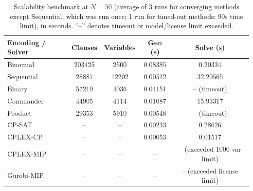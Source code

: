 \documentclass[a4paper,fleqn]{cas-sc}
\begin{document}
\begin{table}[htbp]
    \centering
    \renewcommand{\arraystretch}{1.10}
    \caption{Scalability benchmark at $N=50$ (average of 3 runs for converging methods except Sequential, which was run once; 1 run for timed-out methods; 90s time limit), in seconds. ``--'' denotes timeout or model/license limit exceeded.}
    \label{tab:scalability50}
    \begin{tabular}{l S[table-format=6.0] S[table-format=5.0] S[table-format=1.5] S[table-format=2.5]}
        \toprule
        \textbf{Encoding / Solver} & \textbf{Clauses} & \textbf{Variables} & \textbf{Gen (s)} & \textbf{Solve (s)} \\
        \midrule
        Binomial  & 203425 & 2500 & 0.08385 & 0.20334 \\
        Sequential & 28887 & 12202 & 0.00512 & 32.20565 \\
        Binary    & 57219 & 4036 & 0.04151 & {-- (timeout)} \\
        Commander & 44905 & 4114 & 0.01087 & 15.93317 \\
        Product   & 29353 & 5910 & 0.00548 & {-- (timeout)} \\
        \midrule
        CP-SAT    & {--}     &   {--}  & 0.00233 & 0.28626 \\
        CPLEX-CP  & {--}     &   {--}  & 0.00053 & 0.01517 \\
        CPLEX-MIP & {--}     &   {--}  & {--}      & {-- (exceeded 1000-var limit)} \\
        Gurobi-MIP& {--}     &   {--}  & {--}      & {-- (exceeded license limit)} \\
        \bottomrule
    \end{tabular}
\end{table}
\end{document}
